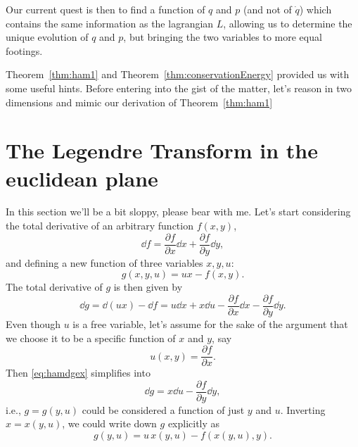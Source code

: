 \documentclass[english,fontsize=11pt,paper=b5]{scrbook}
\numberwithin{equation}{chapter}
\theoremstyle{definition}
\begin{document}
    Our current quest is then to find a function of $q$ and $p$ (and not of $\dot q$) which contains the same information as the lagrangian $L$, allowing us to determine the unique evolution of $q$ and $p$, but bringing the two variables to more equal footings.

    Theorem~\ref{thm:ham1} and Theorem~\ref{thm:conservationEnergy} provided us with some useful hints.
    Before entering into the gist of the matter, let's reason in two dimensions and mimic our derivation of Theorem~\ref{thm:ham1}

    \section{The Legendre Transform in the euclidean plane}

    In this section we'll be a bit sloppy, please bear with me.
    Let's start considering the total derivative of an arbitrary function $f(x,y)$,
    \begin{equation}
      \dd f = \frac{\partial f}{\partial x} \dd x + \frac{\partial f}{\partial y} \dd y,
    \end{equation}
    and defining a new function of three variables $x,y,u$:
    \begin{equation}
      g(x,y,u) = ux - f(x,y).
    \end{equation}
    The total derivative of $g$ is then given by
    \begin{equation}\label{eq:hamdgex}
      \dd g = \dd(ux) - \dd f = u\dd x + x \dd u - \frac{\partial f}{\partial x} \dd x - \frac{\partial f}{\partial y} \dd y.
    \end{equation}
    Even though $u$ is a free variable, let's assume for the sake of the argument that we choose it to be a specific function of $x$  and $y$, say
    \begin{equation}
      u(x,y) = \frac{\partial f}{\partial x}.
    \end{equation}
    Then \eqref{eq:hamdgex} simplifies into
    \begin{equation}
      \dd g = x \dd u - \frac{\partial f}{\partial y} \dd y,
    \end{equation}
    i.e., $g=g(y,u)$ could be considered a function of just $y$ and $u$.
    Inverting $x = x(y,u)$, we could write down $g$ explicitly as
    \begin{equation}
      g(y,u) = u\, x(y,u) - f(x(y, u), y).
    \end{equation}
\end{document}
